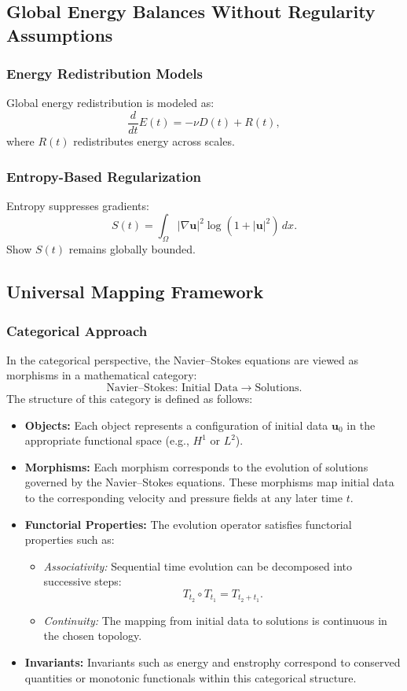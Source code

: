 \documentclass[12pt]{article}
\numberwithin{equation}{section}
\begin{document}
\subsection{Global Energy Balances Without Regularity Assumptions}
\subsubsection{Energy Redistribution Models}
Global energy redistribution is modeled as:
\[
\frac{d}{dt} E(t) = -\nu D(t) + R(t),
\]
where $R(t)$ redistributes energy across scales.

\subsubsection{Entropy-Based Regularization}
Entropy suppresses gradients:
\[
S(t) = \int_\Omega |\nabla \mathbf{u}|^2 \log(1 + |\mathbf{u}|^2) \, dx.
\]
Show $S(t)$ remains globally bounded.

\subsection{Universal Mapping Framework}
\subsubsection{Categorical Approach}
In the categorical perspective, the Navier--Stokes equations are viewed as morphisms in a mathematical category:
\[
\text{Navier--Stokes: Initial Data} \to \text{Solutions}.
\]
The structure of this category is defined as follows:
\begin{itemize}
    \item \textbf{Objects:} Each object represents a configuration of initial data $\mathbf{u}_0$ in the appropriate functional space (e.g., $H^1$ or $L^2$).
    \item \textbf{Morphisms:} Each morphism corresponds to the evolution of solutions governed by the Navier--Stokes equations. These morphisms map initial data to the corresponding velocity and pressure fields at any later time $t$.
    \item \textbf{Functorial Properties:} The evolution operator satisfies functorial properties such as:
    \begin{itemize}
        \item \emph{Associativity:} Sequential time evolution can be decomposed into successive steps:
        \[
        T_{t_2} \circ T_{t_1} = T_{t_2 + t_1}.
        \]
        \item \emph{Continuity:} The mapping from initial data to solutions is continuous in the chosen topology.
    \end{itemize}
    \item \textbf{Invariants:} Invariants such as energy and enstrophy correspond to conserved quantities or monotonic functionals within this categorical structure.
\end{itemize}
\end{document}
